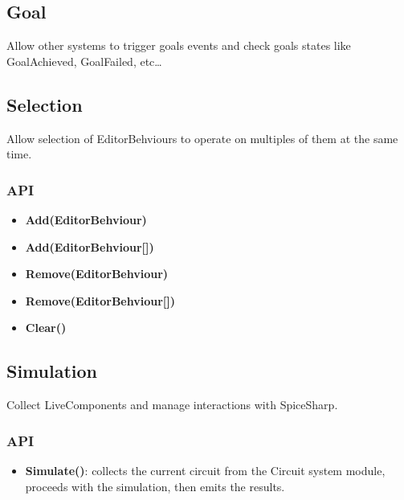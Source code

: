 \documentclass[../main.tex]{subfiles}
\begin{document}
\subsection{Goal}
Allow other systems to trigger goals events and check goals states like GoalAchieved, GoalFailed, etc\dots
\subsection{Selection}
Allow selection of EditorBehviours to operate on multiples of them at the same time.
\subsubsection*{API}
\begin{itemize}
    \item \textbf{Add(EditorBehviour)}
    \item \textbf{Add(EditorBehviour[])}
    \item \textbf{Remove(EditorBehviour)}
    \item \textbf{Remove(EditorBehviour[])}
    \item \textbf{Clear()}
    
\end{itemize}
\subsection{Simulation}
Collect LiveComponents and manage interactions with SpiceSharp.
\subsubsection*{API}
\begin{itemize}
    \item \textbf{Simulate()}: collects the current circuit from the Circuit system module, proceeds with the simulation, then emits the results.
\end{itemize}
\end{document}
